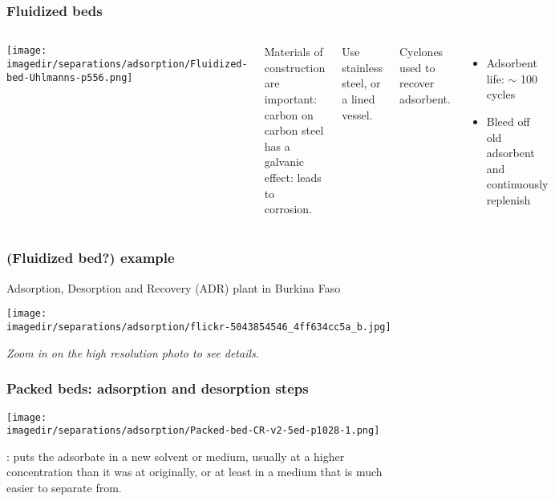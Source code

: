\begin{frame}\frametitle{Fluidized beds}
	\begin{columns}[t]
			\begin{center}
				\texttt{[image: \\imagedir/separations/adsorption/Fluidized-bed-Uhlmanns-p556.png]}
			\end{center}
			\vspace{-18pt}
			Materials of construction are important: carbon on carbon steel has a galvanic effect: leads to corrosion. 
			
			Use stainless steel, or a lined vessel.
			
			\vspace{12pt}
			Cyclones used to recover adsorbent.
			
			\begin{itemize}
				\item	Adsorbent life: $\sim$ 100 cycles
				\item	Bleed off old adsorbent and continuously replenish
			\end{itemize}
	\end{columns}	
\end{frame}

\begin{frame}\frametitle{(Fluidized bed?) example}
	Adsorption, Desorption and Recovery (ADR) plant in Burkina Faso
	\begin{center}
		\texttt{[image: \\imagedir/separations/adsorption/flickr-5043854546\_4ff634cc5a\_b.jpg]}
	\end{center}
	\vspace{-12pt}
	\emph{Zoom in on the high resolution photo to see details.}
\end{frame}

\begin{frame}\frametitle{Packed beds: adsorption and desorption steps}
	\begin{center}
		\texttt{[image: \\imagedir/separations/adsorption/Packed-bed-CR-v2-5ed-p1028-1.png]}
	\end{center}
	\vspace{-6pt}
	
	{\color{purple}{Regeneration}}: puts the adsorbate in a new solvent or medium, usually at a higher concentration than it was at originally, or at least in a medium that is much easier to separate from.
\end{frame}

